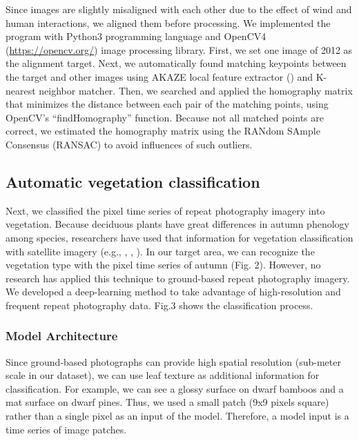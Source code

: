 \documentclass{article}
\begin{document}
Since images are slightly misaligned with each other due to the effect of wind and human interactions, we aligned them before processing. We implemented the program with Python3 programming language and OpenCV4 (\url{https://opencv.org/}) image processing library. First, we set one image of 2012 as the alignment target. Next, we automatically found matching keypoints between the target and other images using AKAZE local feature extractor (\cite{Alcantarilla2013AKAZE}) and K-nearest neighbor matcher. Then, we searched and applied the homography matrix that minimizes the distance between each pair of the matching points, using OpenCV's ``findHomography'' function. Because not all matched points are correct, we estimated the homography matrix using the RANdom SAmple Consensus (RANSAC) to avoid influences of such outliers.

\hypertarget{automatic-vegetation-classification}{%
\subsection{Automatic vegetation classification}\label{automatic-vegetation-classification}}

Next, we classified the pixel time series of repeat photography imagery into vegetation. Because deciduous plants have great differences in autumn phenology among species, researchers have used that information for vegetation classification with satellite imagery (e.g., \cite{Tigges2013RemSenEnv}, \cite{Son2013RemSen}, \cite{Heupel2018PFG}). In our target area, we can recognize the vegetation type with the pixel time series of autumn (Fig. 2). However, no research has applied this technique to ground-based repeat photography imagery. We developed a deep-learning method to take advantage of high-resolution and frequent repeat photography data. Fig.3 shows the classification process.

\hypertarget{model-architecture}{%
\subsubsection{Model Architecture}\label{model-architecture}}

Since ground-based photographs can provide high spatial resolution (sub-meter scale in our dataset), we can use leaf texture as additional information for classification. For example, we can see a glossy surface on dwarf bamboos and a mat surface on dwarf pines. Thus, we used a small patch (9x9 pixels square) rather than a single pixel as an input of the model. Therefore, a model input is a time series of image patches.
\end{document}
